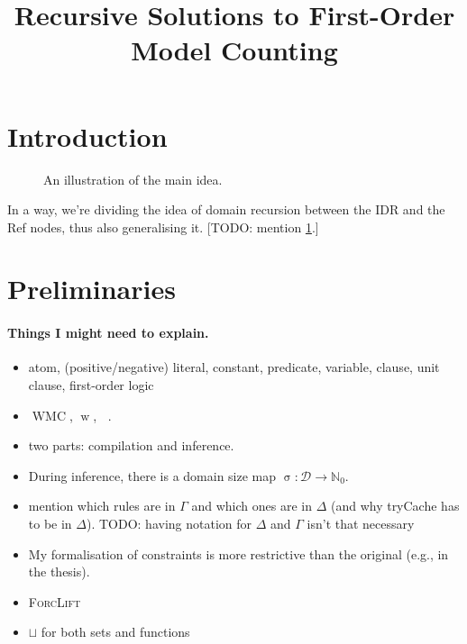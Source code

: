 \documentclass{article}
\title{Recursive Solutions to First-Order Model Counting}
\theoremstyle{definition}
\theoremstyle{remark}
\DeclareMathOperator{\wwp}{w}
\DeclareMathOperator{\wwn}{\overline{w}}
\DeclareMathOperator{\size}{\sigma}
\DeclareMathOperator{\WMC}{WMC}
\begin{document}
\maketitle

\section{Introduction}

\begin{figure}[t]
  \centering
  \caption{An illustration of the main idea.}
  \label{fig:idea}
\end{figure}

In a way, we're dividing the idea of domain recursion between the IDR and the Ref nodes, thus also generalising it. [TODO: mention \cref{fig:idea}.]

\section{Preliminaries}

\paragraph{Things I might need to explain.}
\begin{itemize}
\item atom, (positive/negative) literal, constant, predicate, variable, clause, unit clause, first-order logic
\item $\WMC$, $\wwp$, $\wwn$.
\item two parts: compilation and inference.
\item During inference, there is a domain size map $\size\colon \mathcal{D} \to \mathbb{N}_0$.
\item mention which rules are in $\Gamma$ and which ones are in $\Delta$ (and why tryCache has to be in $\Delta$). TODO: having notation for $\Delta$ and $\Gamma$ isn't that necessary
\item My formalisation of constraints is more restrictive than the original (e.g., in the thesis).
\item \textsc{ForcLift}
\item $\sqcup$ for both sets and functions
\end{itemize}
\end{document}
